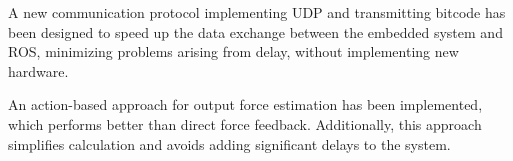 A new communication protocol implementing UDP and transmitting bitcode has been designed to speed up the data exchange between the embedded system and ROS, minimizing problems arising from delay, without implementing new hardware.

An action-based approach for output force estimation has been implemented, which performs better than direct force feedback.
 Additionally, this approach simplifies calculation and avoids adding significant delays to the system.